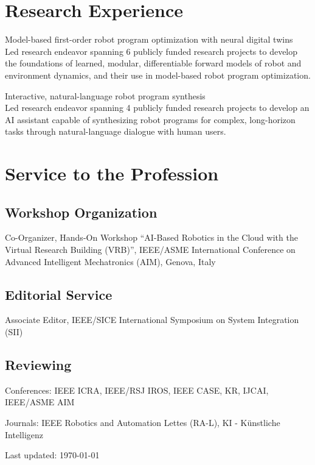 \documentclass[11pt]{article} %
\begin{document}

\section*{Research Experience}

Model-based first-order robot program optimization with neural digital twins\\
Led research endeavor spanning 6 publicly funded research projects to develop the foundations of learned, modular, differentiable forward models of robot and environment dynamics, and their use in model-based robot program optimization.

Interactive, natural-language robot program synthesis\\
Led research endeavor spanning 4 publicly funded research projects to develop an AI assistant capable of synthesizing robot programs for complex, long-horizon tasks through natural-language dialogue with human users.

\section*{Service to the Profession}

\subsection*{Workshop Organization}

Co-Organizer, Hands-On Workshop ``AI-Based Robotics in the Cloud with the Virtual Research Building (VRB)'', IEEE/ASME International Conference on Advanced Intelligent Mechatronics (AIM), Genova, Italy

\subsection*{Editorial Service}

Associate Editor, IEEE/SICE International Symposium on System Integration (SII)

\subsection*{Reviewing}

Conferences: IEEE ICRA, IEEE/RSJ IROS, IEEE CASE, KR, IJCAI, IEEE/ASME AIM

Journals: IEEE Robotics and Automation Lettes (RA-L), KI - Künstliche Intelligenz

\vfill %


\begin{center}
	\scriptsize
	Last updated: \today
\end{center}

\end{document}
